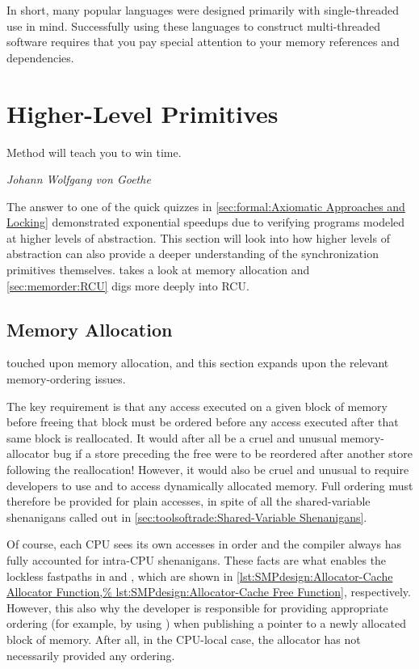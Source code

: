 In short, many popular languages were designed primarily with
single-threaded use in mind.
Successfully using these languages to construct multi-threaded software
requires that you pay special attention to your memory references and
dependencies.

\section{Higher-Level Primitives}
\label{sec:memorder:Higher-Level Primitives}
%
\epigraph{Method will teach you to win time.}
	 {\emph{Johann Wolfgang von Goethe}}

The answer to one of the quick quizzes in
\cref{sec:formal:Axiomatic Approaches and Locking}
demonstrated exponential speedups due to verifying programs
modeled at higher levels of abstraction.
This section will look into how higher levels of abstraction can
also provide a deeper understanding of the synchronization primitives
themselves.
takes a look at memory allocation and
\cref{sec:memorder:RCU}
digs more deeply into RCU.

\subsection{Memory Allocation}
\label{sec:memorder:Memory Allocation}

touched upon memory allocation, and this section expands upon the relevant
memory-ordering issues.

The key requirement is that any access executed on a given block of
memory before freeing that block must be ordered before any access
executed after that same block is reallocated.
It would after all be a cruel and unusual memory-allocator bug if a store
preceding the free were to be reordered after another store following
the reallocation!
However, it would also be cruel and unusual to require developers to use
 and  to access dynamically allocated
memory.
Full ordering must therefore be provided for plain accesses, in spite of
all the shared-variable shenanigans called out in
\cref{sec:toolsoftrade:Shared-Variable Shenanigans}.

Of course, each CPU sees its own accesses in order and the compiler
always has fully accounted for intra-CPU shenanigans.
These facts are what enables the lockless fastpaths in
 and , which are shown in
\cref{lst:SMPdesign:Allocator-Cache Allocator Function,%
lst:SMPdesign:Allocator-Cache Free Function},
respectively.
However, this also why the developer is responsible for providing
appropriate ordering (for example, by using )
when publishing a pointer to a newly allocated block of memory.
After all, in the CPU-local case, the allocator has not necessarily
provided any ordering.

